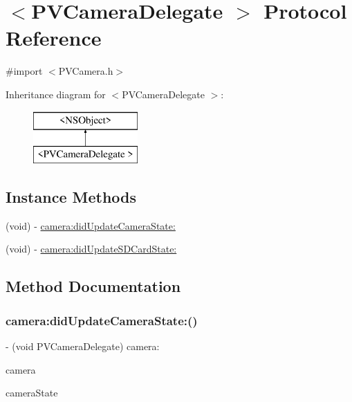 \hypertarget{protocol_p_v_camera_delegate_01-p}{}\section{$<$P\+V\+Camera\+Delegate $>$ Protocol Reference}
\label{protocol_p_v_camera_delegate_01-p}


{\ttfamily \#import $<$P\+V\+Camera.\+h$>$}

Inheritance diagram for $<$P\+V\+Camera\+Delegate $>$\+:\begin{figure}[H]
\begin{center}
\leavevmode
\includegraphics[height=2.000000cm]{protocol_p_v_camera_delegate_01-p}
\end{center}
\end{figure}
\subsection*{Instance Methods}
\begin{DoxyCompactItemize}
\item 
(void) -\/ \hyperlink{protocol_p_v_camera_delegate_01-p_aa58a1f040f4f4d846c40ee306c1148f3}{camera\+:did\+Update\+Camera\+State\+:}
\item 
(void) -\/ \hyperlink{protocol_p_v_camera_delegate_01-p_a0d5273f1649f23a91c872e8b27e66511}{camera\+:did\+Update\+S\+D\+Card\+State\+:}
\end{DoxyCompactItemize}


\subsection{Method Documentation}
\mbox{\label{protocol_p_v_camera_delegate_01-p_aa58a1f040f4f4d846c40ee306c1148f3}} 
\subsubsection{\texorpdfstring{camera\+:did\+Update\+Camera\+State\+:()}{camera:didUpdateCameraState:()}}
{\footnotesize\ttfamily -\/ (void P\+V\+Camera\+Delegate) camera\+: \begin{DoxyParamCaption}\item[{(\hyperlink{interface_p_v_camera}{P\+V\+Camera} $\ast$\+\_\+\+Nonnull)}]{camera }\item[{didUpdateCameraState:(P\+V\+Camera\+State)}]{camera\+State }\end{DoxyParamCaption}\hspace{0.3cm}{\ttfamily [optional]}}

